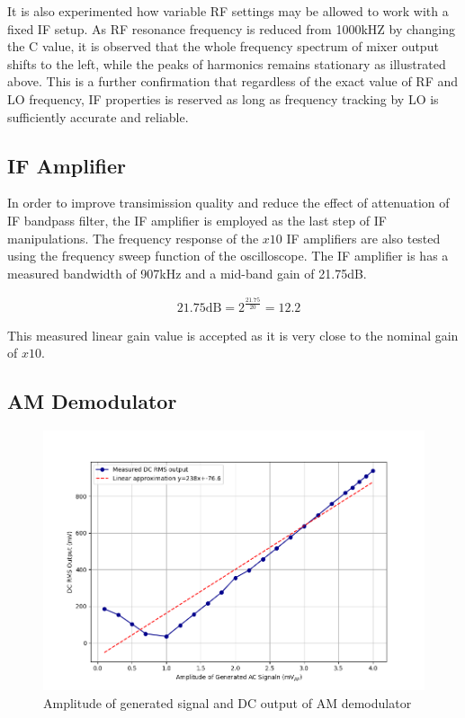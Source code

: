 \documentclass[a4paper,12pt]{article}
\begin{document}
It is also experimented how variable RF settings may be allowed to work with a fixed IF setup. As RF resonance frequency is reduced from 1000kHZ by changing the C value, it is observed that the whole frequency spectrum of mixer output shifts to the left, while the peaks of harmonics remains stationary as illustrated above.
This is a further confirmation that regardless of the exact value of RF and LO frequency, IF properties is reserved as long as frequency tracking by LO is sufficiently accurate and reliable.

\subsection{IF Amplifier}
In order to improve transimission quality and reduce the effect of attenuation of IF bandpass filter, the IF amplifier is employed as the last step of IF manipulations.
The frequency response of the $x10$ IF amplifiers are also tested using the frequency sweep function of the oscilloscope. The IF amplifier is has a measured bandwidth of 907kHz and a mid-band gain of 21.75dB.

\begin{align}
    & 21.75\text{dB}=2^{\frac{21.75}{20}}=12.2
\end{align}

This measured linear gain value is accepted as it is very close to the nominal gain of $x10$.

\subsection{AM Demodulator}

\vspace{-1.5em}
\begin{figure}[h]
    \centering
    \includegraphics[width=\textwidth]{am_demod.png}
    \caption{Amplitude of generated signal and DC output of AM demodulator}
    \label{fig:am_demod}
\end{figure}
\end{document}
